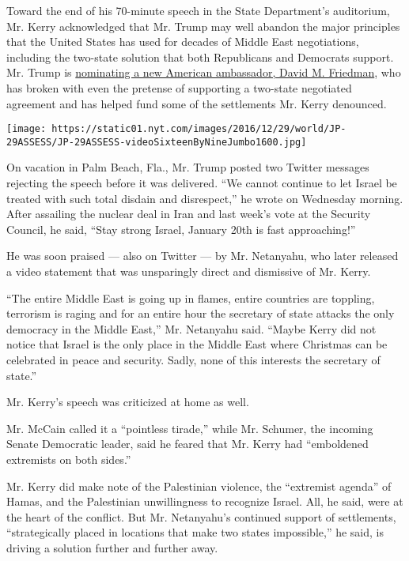 Toward the end of his 70-minute speech in the State Department's
auditorium, Mr. Kerry acknowledged that Mr. Trump may well abandon the
major principles that the United States has used for decades of Middle
East negotiations, including the two-state solution that both
Republicans and Democrats support. Mr. Trump is
\href{https://www.nytimes.com/2016/12/16/world/middleeast/david\%2Dfriedman\%2Dus\%2Dambassador\%2Disrael.html?_r=0}{nominating
a new American ambassador, David M. Friedman}, who has broken with even
the pretense of supporting a two-state negotiated agreement and has
helped fund some of the settlements Mr. Kerry denounced.

\texttt{[image: https://static01.nyt.com/images/2016/12/29/world/JP-29ASSESS/JP-29ASSESS-videoSixteenByNineJumbo1600.jpg]}

On vacation in Palm Beach, Fla., Mr. Trump posted two Twitter messages
rejecting the speech before it was delivered. ``We cannot continue to
let Israel be treated with such total disdain and disrespect,'' he wrote
on Wednesday morning. After assailing the nuclear deal in Iran and last
week's vote at the Security Council, he said, ``Stay strong Israel,
January 20th is fast approaching!''

He was soon praised --- also on Twitter --- by Mr. Netanyahu, who later
released a video statement that was unsparingly direct and dismissive of
Mr. Kerry.

``The entire Middle East is going up in flames, entire countries are
toppling, terrorism is raging and for an entire hour the secretary of
state attacks the only democracy in the Middle East,'' Mr. Netanyahu
said. ``Maybe Kerry did not notice that Israel is the only place in the
Middle East where Christmas can be celebrated in peace and security.
Sadly, none of this interests the secretary of state.''

Mr. Kerry's speech was criticized at home as well.

Mr. McCain called it a ``pointless tirade,'' while Mr. Schumer, the
incoming Senate Democratic leader, said he feared that Mr. Kerry had
``emboldened extremists on both sides.''

Mr. Kerry did make note of the Palestinian violence, the ``extremist
agenda'' of Hamas, and the Palestinian unwillingness to recognize
Israel. All, he said, were at the heart of the conflict. But Mr.
Netanyahu's continued support of settlements, ``strategically placed in
locations that make two states impossible,'' he said, is driving a
solution further and further away.

